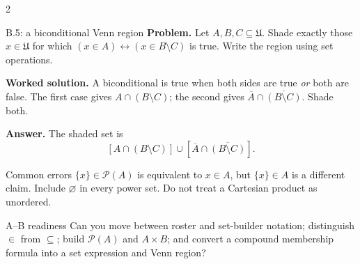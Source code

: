 \documentclass[10pt]{article}
\newcommand{\U}{\mathfrak U}
\newcommand{\vennregion}[3]{%
  \begin{scope}
    \ifnum#1=1\relax\pgfsetnonzerorule\clip (-0.55,0.3) circle (0.95);\else
      \pgfseteorule\clip (-1.65,-1.65) rectangle (1.65,1.45)
        (-0.55,0.3) circle (0.95);\fi
    \ifnum#2=1\relax\pgfsetnonzerorule\clip (0.55,0.3) circle (0.95);\else
      \pgfseteorule\clip (-1.65,-1.65) rectangle (1.65,1.45)
        (0.55,0.3) circle (0.95);\fi
    \ifnum#3=1\relax\pgfsetnonzerorule\clip (0,-0.6) circle (0.95);\else
      \pgfseteorule\clip (-1.65,-1.65) rectangle (1.65,1.45)
        (0,-0.6) circle (0.95);\fi
    \fill[CoreTeal!28] (-1.65,-1.65) rectangle (1.65,1.45);
  \end{scope}}
\newcommand{\vennframe}{%
  \draw[CoreNavy,thick] (-1.65,-1.65) rectangle (1.65,1.45);
  \draw[CoreNavy] (-0.55,0.3) circle (0.95);
  \draw[CoreNavy] (0.55,0.3) circle (0.95);
  \draw[CoreNavy] (0,-0.6) circle (0.95);
  \node[fill=white,inner sep=1pt] at (-1,0.9) {$A$};
  \node[fill=white,inner sep=1pt] at (1,0.9) {$B$};
  \node[fill=white,inner sep=1pt] at (0,-1.25) {$C$};
  \node[anchor=north west,inner sep=2pt] at (-1.65,1.45) {$\U$};}
\begin{document}
\begin{multicols}{2}
\begin{workedbox}{B.5: a biconditional Venn region}
\textbf{Problem.} Let $A,B,C\subseteq\U$. Shade exactly those $x\in\U$ for
which $(x\in A)\leftrightarrow(x\in B\setminus C)$ is true. Write the region
using set operations.

\textbf{Worked solution.} A biconditional is true when both sides are true
\emph{or} both are false. The first case gives $A\cap(B\setminus C)$;
the second gives $\overline A\cap\overline{(B\setminus C)}$. Shade both.
\begin{center}
\end{center}
\textbf{Answer.} The shaded set is
\[
[A\cap(B\setminus C)]\cup[\overline A\cap\overline{(B\setminus C)}].
\]
\end{workedbox}

\begin{warningbox}{Common errors}
$\{x\}\in\mathcal P(A)$ is equivalent to $x\in A$, but $\{x\}\in A$ is a
different claim. Include $\varnothing$ in every power set. Do not treat a
Cartesian product as unordered.
\end{warningbox}

\begin{checklistbox}{A--B readiness}
Can you move between roster and set-builder notation; distinguish $\in$ from
$\subseteq$; build $\mathcal P(A)$ and $A\times B$; and convert a compound
membership formula into a set expression and Venn region?
\end{checklistbox}
\end{multicols}

\bigskip
\end{document}
